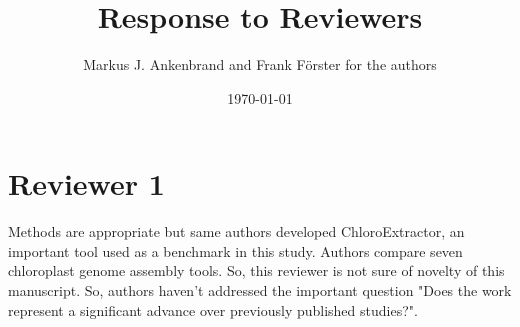 \documentclass[a4paper,10pt]{scrartcl}
\title{Response to Reviewers}
\author{Markus J. Ankenbrand and Frank F\"{o}rster for the authors}
\date{\today}
\begin{document}
\maketitle
\section{Reviewer 1}
Methods are appropriate but same authors developed ChloroExtractor, an important tool used as a benchmark in this study.
Authors compare seven chloroplast genome assembly tools.
So, this reviewer is not sure of novelty of this manuscript.
So, authors haven't addressed the important question "Does the work represent a significant advance over previously published studies?".  
\end{document}
